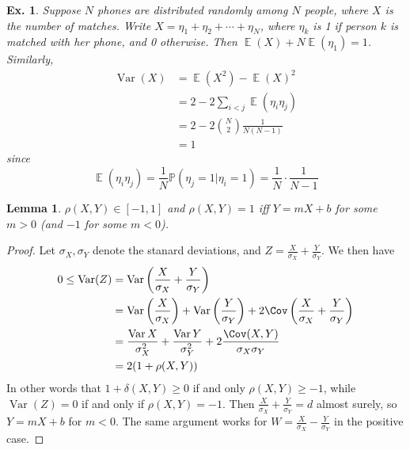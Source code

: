 \documentclass[12pt, a4paper]{book}
\DeclareMathOperator{\E}{\mathbb{E}}
\DeclareMathOperator{\Var}{Var}
\renewcommand{\Pr}{\mathbb{P}}
\newtheorem{lemma}[theorem]{Lemma}
\newtheorem{example}[theorem]{Ex.}
\theoremstyle{nonumberplain}
\newtheorem{proof}{Proof}
\begin{document}
\begin{example}
    Suppose $N$ phones are distributed randomly among $N$ people, where $X$ is the number of matches.
    Write $X=\eta_1+\eta_2+\cdots+\eta_N$, where $\eta_k$ is 1 if person $k$ is matched with her phone, and 0 otherwise.
    Then $\E(X)+N\E(\eta_1)=1$.
    Similarly,
    \begin{align*}
        \Var(X)&=\E(X^2)-\E(X)^2\\
               &= 2-2\sum\limits_{i<j}\E(\eta_i\eta_j)\\
               &= 2-2\binom{N}{2}\frac{1}{N(N-1)}\\
               &= 1
    \end{align*}
    since
    \[\E(\eta_i\eta_j)=\frac{1}{N}\Pr(\eta_j=1|\eta_i=1)=\frac{1}{N}\cdot\frac{1}{N-1}\]
\end{example}
\begin{lemma}
    $\rho(X,Y)\in[-1,1]$ and $\rho(X,Y)=1$ iff $Y=mX+b$ for some $m>0$ (and $-1$ for some $m<0$).
\end{lemma}
\begin{proof}
    Let $\sigma_X,\sigma_Y$ denote the stanard deviations, and $Z=\frac{X}{\sigma_X}+\frac{Y}{\sigma_Y}$.
    We then have
    \begin{align*}
        0\leq\Var(Z) &= \Var\left(\frac{X}{\sigma_X}+\frac{Y}{\sigma_Y}\right)\\
                     &= \Var\left(\frac{X}{\sigma_X}\right)+\Var\left(\frac{Y}{\sigma_Y}\right)+2\Cov\left(\frac{X}{\sigma_X}+\frac{Y}{\sigma_Y}\right)\\
                     &= \frac{\Var X}{\sigma_X^2}+\frac{\Var Y}{\sigma_Y^2}+2\frac{\Cov(X,Y)}{\sigma_X\sigma_Y}\\
                     &= 2(1+\rho(X,Y))
    \end{align*}
    In other words that $1+\delta(X,Y)\geq 0$ if and only $\rho(X,Y)\geq -1$, while $\Var(Z)=0$ if and only if $\rho(X,Y)=-1$.
    Then $\frac{X}{\sigma_X}+\frac{Y}{\sigma_Y}=d$ almost surely, so $Y=mX+b$ for $m<0$.
    The same argument works for $W=\frac{X}{\sigma_X}-\frac{Y}{\sigma_Y}$ in the positive case.
\end{proof}
\end{document}

